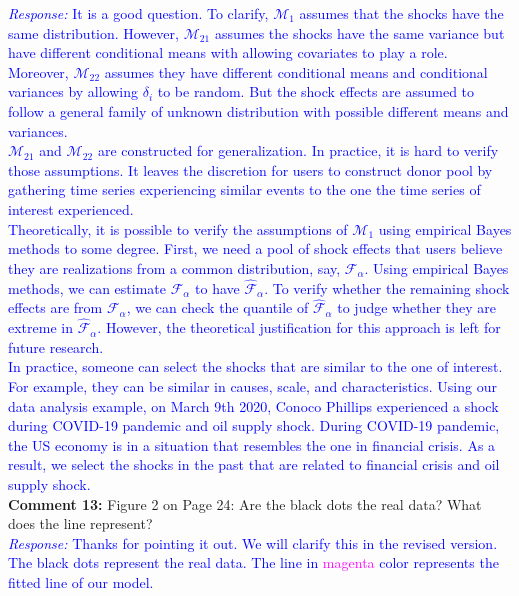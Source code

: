 \documentclass[12pt]{article}
\newcommand{\response}[1]{\noindent \textcolor{blue}{\emph{Response:} #1}}
\begin{document}
\response{It is a good question. To clarify, $\mathcal{M}_1$ assumes that the shocks have the same distribution. However, $\mathcal{M}_{21}$ assumes the shocks have the same variance but have different conditional means with allowing covariates to play a role. Moreover, $\mathcal{M}_{22}$ assumes they have different conditional means and conditional variances by allowing $\delta_i$ to be random. But the shock effects are assumed to follow a general family of  unknown distribution with possible different means and variances.\\

$\mathcal{M}_{21}$ and $\mathcal{M}_{22}$ are constructed for generalization. In practice, it is hard to verify those assumptions. It leaves the discretion for users to construct donor pool by gathering time series experiencing similar events to the one the time series of interest experienced. \\

Theoretically, it is possible to verify the assumptions of $\mathcal{M}_{1}$ using empirical Bayes methods to some degree. First, we need a  pool of shock effects that users believe they are realizations from a common distribution, say, $\mathcal{F}_{\alpha}$. Using empirical Bayes methods, we can estimate $\mathcal{F}_{\alpha}$ to have $\hat{\mathcal{F}}_{\alpha}$. To verify whether the remaining shock effects are from $\mathcal{F}_{\alpha}$, we can check the quantile of $\hat{\mathcal{F}}_{\alpha}$ to judge whether they are extreme in $\hat{\mathcal{F}}_{\alpha}$. However, the theoretical justification for this approach is left for future research. \\

In practice, someone can select the shocks that are similar to the one of interest. For example, they can be similar in causes, scale, and characteristics. Using our data analysis example, on March 9th 2020, Conoco Phillips experienced a shock during COVID-19 pandemic and oil supply shock. During COVID-19 pandemic, the US economy is in a situation that resembles the one in financial crisis. As a result, we select the shocks in the past that are related to financial crisis and oil supply shock.} \\


{\bf Comment 13:} Figure 2 on Page 24: Are the black dots the real data? What does the line represent?\\

\response{Thanks for pointing it out. We will clarify this in the revised version. The black dots represent the real data. The line in \textcolor{magenta}{magenta} color represents the fitted line of our model.}


\end{document}
